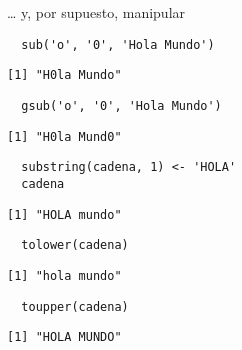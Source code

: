 \documentclass[xcolor={usenames,svgnames,dvipsnames}]{beamer}
\begin{document}
\begin{frame}[fragile,label={sec:orgbb8d965}]{\ldots{} y, por supuesto, manipular}
 \lstset{language=r,label= ,caption= ,captionpos=b,numbers=none}
\begin{lstlisting}
  sub('o', '0', 'Hola Mundo')
\end{lstlisting}

\begin{verbatim}
[1] "H0la Mundo"
\end{verbatim}

\lstset{language=r,label= ,caption= ,captionpos=b,numbers=none}
\begin{lstlisting}
  gsub('o', '0', 'Hola Mundo')
\end{lstlisting}

\begin{verbatim}
[1] "H0la Mund0"
\end{verbatim}

\lstset{language=r,label= ,caption= ,captionpos=b,numbers=none}
\begin{lstlisting}
  substring(cadena, 1) <- 'HOLA'
  cadena
\end{lstlisting}

\begin{verbatim}
[1] "HOLA mundo"
\end{verbatim}

\lstset{language=r,label= ,caption= ,captionpos=b,numbers=none}
\begin{lstlisting}
  tolower(cadena)
\end{lstlisting}

\begin{verbatim}
[1] "hola mundo"
\end{verbatim}

\lstset{language=r,label= ,caption= ,captionpos=b,numbers=none}
\begin{lstlisting}
  toupper(cadena)
\end{lstlisting}

\begin{verbatim}
[1] "HOLA MUNDO"
\end{verbatim}
\end{frame}
\end{document}

